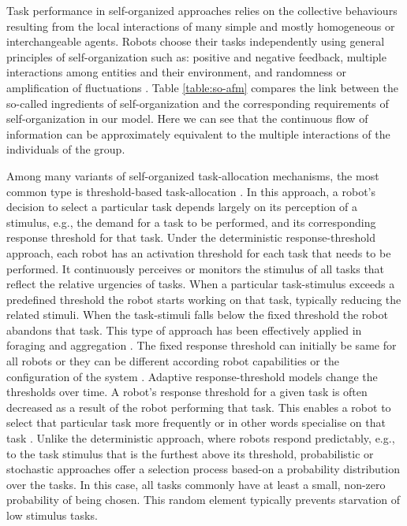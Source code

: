 \documentclass[smallcondensed]{svjour3}
\begin{document}
Task performance in self-organized approaches relies on the collective behaviours resulting from the local interactions of many simple and mostly homogeneous or interchangeable agents. Robots choose their tasks independently using general principles of self-organization such as: positive and negative feedback, multiple interactions among entities and their environment, and randomness or amplification of fluctuations \citep{Camazine+2001}. Table \ref{table:so-afm} compares the link between the so-called ingredients of self-organization and the corresponding requirements of self-organization in our model. Here we can see that the continuous flow of information can be approximately equivalent to the multiple interactions of the individuals of the group.

Among many variants of self-organized task-allocation mechanisms, the most common type is threshold-based task-allocation \citep{Bonabeau+1999}. In this approach, a robot's decision to select a particular task depends largely on its perception of a stimulus, e.g., the demand for a task to be performed, and its corresponding response threshold for that task. Under the deterministic response-threshold approach, each robot has an activation threshold for each task that needs to be performed. It continuously perceives or monitors the stimulus of all tasks that reflect the relative urgencies of tasks. When a particular task-stimulus exceeds a predefined threshold the robot starts working on that task, typically reducing the related stimuli. When the task-stimuli falls below the fixed threshold the robot abandons that task. This type of approach has been effectively applied in foraging \citep{Liu+2007,Krieger+2000} and aggregation \citep{Agassounon+2002}. The fixed response threshold can initially be same for all robots \citep{Jones+2000} or they can be different according robot capabilities or the configuration of the system \citep{Krieger+2000}. Adaptive response-threshold models change the thresholds over time. A robot's response threshold for a given task is often decreased as a result of the robot performing that task. This enables a robot to select that particular task more frequently or in other words specialise on that task \citep{Bonabeau+1999,Agassounon+2002}. Unlike the deterministic approach, where robots respond predictably, e.g., to the task stimulus that is the furthest above its threshold, probabilistic or stochastic approaches offer a selection process based-on a probability distribution over the tasks. In this case, all tasks commonly have at least a small, non-zero probability of being chosen. This random element typically prevents starvation of low stimulus tasks. 
\end{document}

